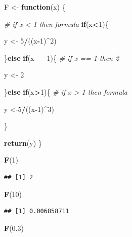 \documentclass[]{article}
\newenvironment{Shaded}{\begin{snugshade}}{\end{snugshade}}
\newcommand{\KeywordTok}[1]{\textcolor[rgb]{0.13,0.29,0.53}{\textbf{#1}}}
\newcommand{\DecValTok}[1]{\textcolor[rgb]{0.00,0.00,0.81}{#1}}
\newcommand{\FloatTok}[1]{\textcolor[rgb]{0.00,0.00,0.81}{#1}}
\newcommand{\StringTok}[1]{\textcolor[rgb]{0.31,0.60,0.02}{#1}}
\newcommand{\CommentTok}[1]{\textcolor[rgb]{0.56,0.35,0.01}{\textit{#1}}}
\newcommand{\ControlFlowTok}[1]{\textcolor[rgb]{0.13,0.29,0.53}{\textbf{#1}}}
\newcommand{\OperatorTok}[1]{\textcolor[rgb]{0.81,0.36,0.00}{\textbf{#1}}}
\newcommand{\NormalTok}[1]{#1}
\begin{document}
\begin{Shaded}
\begin{Highlighting}[]
\NormalTok{F <-}\StringTok{ }\ControlFlowTok{function}\NormalTok{(x) \{}
  
  \CommentTok{# if x < 1 then formula}
  \ControlFlowTok{if}\NormalTok{(x}\OperatorTok{<}\DecValTok{1}\NormalTok{)\{}
  
\NormalTok{    y <-}\StringTok{ }\DecValTok{5}\OperatorTok{/}\NormalTok{((x}\OperatorTok{-}\DecValTok{1}\NormalTok{)}\OperatorTok{^}\DecValTok{2}\NormalTok{)}
  
\NormalTok{  \}}\ControlFlowTok{else} \ControlFlowTok{if}\NormalTok{(x}\OperatorTok{==}\DecValTok{1}\NormalTok{)\{ }\CommentTok{# if x == 1 then 2}
    
\NormalTok{    y <-}\StringTok{ }\DecValTok{2}
  
\NormalTok{  \}}\ControlFlowTok{else} \ControlFlowTok{if}\NormalTok{(x}\OperatorTok{>}\DecValTok{1}\NormalTok{)\{ }\CommentTok{# if x > 1 then formula}
  
\NormalTok{    y <-}\DecValTok{5}\OperatorTok{/}\NormalTok{((x}\OperatorTok{-}\DecValTok{1}\NormalTok{)}\OperatorTok{^}\DecValTok{3}\NormalTok{)}
  
\NormalTok{  \}}
  
  \KeywordTok{return}\NormalTok{(y)}
\NormalTok{\}}

\KeywordTok{F}\NormalTok{(}\DecValTok{1}\NormalTok{)}
\end{Highlighting}
\end{Shaded}

\begin{verbatim}
## [1] 2
\end{verbatim}

\begin{Shaded}
\begin{Highlighting}[]
\KeywordTok{F}\NormalTok{(}\DecValTok{10}\NormalTok{)}
\end{Highlighting}
\end{Shaded}

\begin{verbatim}
## [1] 0.006858711
\end{verbatim}

\begin{Shaded}
\begin{Highlighting}[]
\KeywordTok{F}\NormalTok{(}\FloatTok{0.3}\NormalTok{)}
\end{Highlighting}
\end{Shaded}
\end{document}

